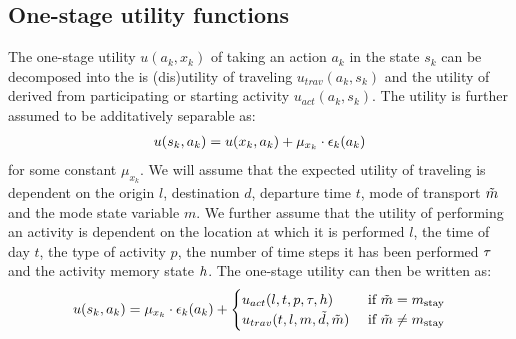 \subsection{One-stage utility functions}
The one-stage utility $u(a_k,x_k)$ of taking an action $a_k$ in the state $s_k$ can be decomposed into the is (dis)utility of traveling $u_{trav}(a_k,s_k)$ and the utility of derived from participating or starting activity $u_{act}(a_k,s_k)$. The utility is further assumed to be additatively separable as:
\begin{equation}
\begin{aligned}
	\avgu(s_k,a_k)& =\avgu(x_k,a_k) + \mu_{x_k}\cdot\epsilon_k(a_k)\\
\end{aligned}
\end{equation}
for some constant $\mu_{x_k}$. We will assume that the expected utility of traveling is dependent on the origin $l$, destination $d$, departure time $t$, mode of transport $\tilde{m}$ and the mode state variable $m$. We further assume that the utility of performing an activity is dependent on the location at which it is performed $l$, the time of day $t$, the type of activity $p$, the number of time steps it has been performed $\tau$ and the activity memory state $h$. The one-stage utility can then be written as:
\begin{equation} \label{eq:mdponestage}
	\avgu(s_k,a_k) = \mu_{x_k}\cdot\epsilon_k(a_k) + \begin{cases}
	\avgu_{act}(l,t,p,\atime,\amem) & \cif \act{m} = m_\text{stay} \\
	\avgu_{trav}(t,l,m,\act{d},\act{m}) &\cif \act{m} \neq m_\text{stay} 
	\end{cases}
\end{equation}

%



